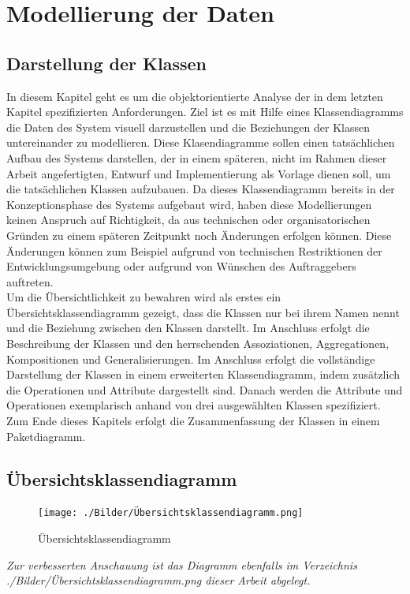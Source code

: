 \section{Modellierung der Daten}
\subsection{Darstellung der Klassen}
In diesem Kapitel geht es um die objektorientierte Analyse der in dem letzten Kapitel spezifizierten Anforderungen. Ziel ist es mit Hilfe eines Klassendiagramms die Daten des System visuell darzustellen und die Beziehungen der Klassen untereinander zu modellieren. Diese Klasendiagramme sollen einen tatsächlichen Aufbau des Systems darstellen, der in einem späteren, nicht im Rahmen dieser Arbeit angefertigten, Entwurf und Implementierung als Vorlage dienen soll, um die tatsächlichen Klassen aufzubauen. Da dieses Klassendiagramm bereits in der Konzeptionsphase des Systems aufgebaut wird, haben diese Modellierungen keinen Anspruch auf Richtigkeit, da aus technischen oder organisatorischen Gründen zu einem späteren Zeitpunkt noch Änderungen erfolgen können. Diese Änderungen können zum Beispiel aufgrund von technischen Restriktionen der Entwicklungsumgebung oder aufgrund von Wünschen des Auftraggebers auftreten.
\\Um die Übersichtlichkeit zu bewahren wird als erstes ein Übersichtsklassendiagramm gezeigt, dass die Klassen nur bei ihrem Namen nennt und die Beziehung zwischen den Klassen darstellt. Im Anschluss erfolgt die Beschreibung der Klassen und den herrschenden Assoziationen, Aggregationen, Kompositionen und Generalisierungen. Im Anschluss erfolgt die vollständige Darstellung der Klassen in einem erweiterten Klassendiagramm, indem zusätzlich die Operationen und Attribute dargestellt sind. Danach werden die Attribute und Operationen exemplarisch anhand von drei ausgewählten Klassen spezifiziert. Zum Ende dieses Kapitels erfolgt die Zusammenfassung der Klassen in einem Paketdiagramm.    

\newpage
\subsection{Übersichtsklassendiagramm}
\begin{figure}[h!]
    \centering
    \texttt{[image: ./Bilder/Übersichtsklassendiagramm.png]}
    \caption[Übersichtsklassendiagramm]{Übersichtsklassendiagramm}
    \label{fig:Übersichtsklassendiagramm}
\end{figure}
\emph{Zur verbesserten Anschauung ist das Diagramm ebenfalls im Verzeichnis ./Bilder/Übersichtsklassendiagramm.png dieser Arbeit abgelegt.}

